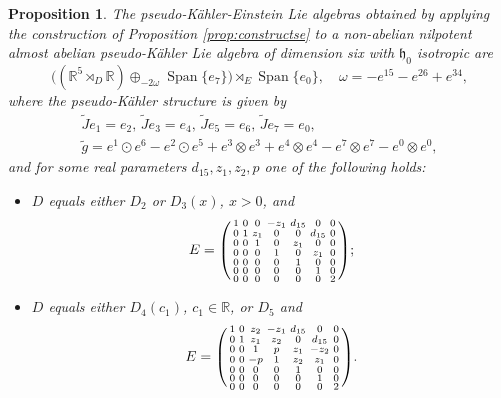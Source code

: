 \documentclass{article}
\newtheorem{proposition}[theorem]{Proposition}
\theoremstyle{definition}
\newcommand{\R}{\mathbb{R}}
\newcommand{\frh}{\mathfrak{h}}
\newcommand{\Span}[1]{\operatorname{Span}\{#1\}}
\newenvironment{smallpmatrix}{\left(\begin{smallmatrix}}{\end{smallmatrix}\right)}
\begin{document}
\begin{proposition}\label{prop:KEextension6d}
    The pseudo-Kähler-Einstein Lie algebras obtained by applying the construction of Proposition \ref{prop:constructse} to a non-abelian nilpotent almost abelian pseudo-Kähler Lie algebra of dimension six with $\frh_0$ isotropic are \begin{equation}\label{eqn:explicitKEext}
        \bigl((\R^5\rtimes_D\R)\oplus_{-2\omega}\Span{e_7}\bigr)\rtimes_{E}\Span{e_0},\quad \omega=-e^{15}-e^{26}+e^{34},
    \end{equation} where the pseudo-Kähler structure is given by \begin{gather*}
        \tilde{J}e_1=e_2,\,\tilde{J}e_3=e_4,\,\tilde{J}e_5=e_6,\,\tilde{J}e_7=e_0,\\
        \tilde{g}=e^1\odot e^6-e^2\odot e^5+e^3\otimes e^3+e^4\otimes e^4-e^7\otimes e^7-e^0\otimes e^0,
    \end{gather*} and for some real parameters $d_{15},z_1,z_2,p$ one of the following holds: \begin{itemize}
        \item $D$ equals either $D_2$ or $D_3(x)$, $x>0$, and $$E=\begin{smallpmatrix}
            1 & 0 & 0 & -z_{1} & d_{15} & 0 & 0\\
            0 & 1 & z_{1} & 0 & 0 & d_{15} & 0\\
            0 & 0 & 1 & 0 & z_{1} & 0 & 0\\
            0 & 0 & 0 & 1 & 0 & z_{1} & 0\\
            0 & 0 & 0 & 0 & 1 & 0 & 0\\
            0 & 0 & 0 & 0 & 0 & 1 & 0\\
            0 & 0 & 0 & 0 & 0 & 0 & 2\\
        \end{smallpmatrix};$$
        \item $D$ equals either $D_4(c_1)$, $c_1\in\R$, or $D_5$ and $$E=\begin{smallpmatrix}
            1 & 0 & z_{2} & -z_{1} & d_{15} & 0 & 0\\
            0 & 1 & z_{1} & z_{2} & 0 & d_{15} & 0\\
            0 & 0 & 1 & p & z_{1} & -z_{2} & 0\\
            0 & 0 & -p & 1 & z_{2} & z_{1} & 0\\
            0 & 0 & 0 & 0 & 1 & 0 & 0\\
            0 & 0 & 0 & 0 & 0 & 1 & 0\\
            0 & 0 & 0 & 0 & 0 & 0 & 2\\
        \end{smallpmatrix}.$$
    \end{itemize}
\end{proposition}
\end{document}
